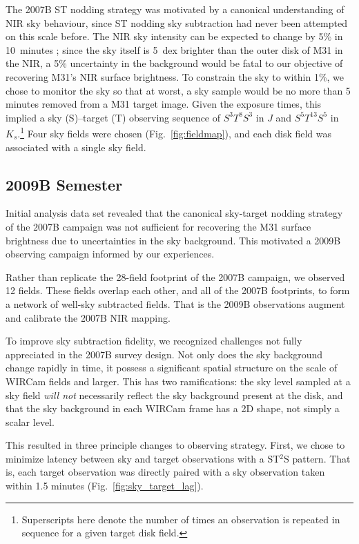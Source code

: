 \documentclass[iop]{emulateapj}
\newcommand{\Fig}[1]{Fig.~\ref{fig:#1}}  %
\begin{document}
The 2007B ST nodding strategy was motivated by a canonical understanding of NIR sky behaviour, since ST nodding sky subtraction had never been attempted on this scale before. The NIR sky intensity can be expected to change by 5\% in 10~minutes \citep{Adams:1996,Vaduvescu:2004}; since the sky itself is 5~dex brighter than the outer disk of M31 in the NIR, a 5\% uncertainty in the background would be fatal to our objective of recovering M31's NIR surface brightness. To constrain the sky to within 1\%, we chose to monitor the sky so that at worst, a sky sample would be no more than 5 minutes removed from a M31 target image. Given the exposure times, this implied a sky (S)--target (T) observing sequence of $S^3T^8S^3$ in $J$ and $S^5T^{13}S^5$ in $K_s$.\footnote{Superscripts here denote the number of times an observation is repeated in sequence for a given target disk field.} Four sky fields were chosen (\Fig{fieldmap}), and each disk field was associated with a single sky field.


\subsection{2009B Semester} %
\label{sub:obs9}

Initial analysis data set revealed that the canonical sky-target nodding strategy of the 2007B campaign was not sufficient for recovering the M31 surface brightness due to uncertainties in the sky background. This motivated a 2009B observing campaign informed by our experiences.

Rather than replicate the 28-field footprint of the 2007B campaign, we observed 12 fields. These fields overlap each other, and all of the 2007B footprints, to form a network of well-sky subtracted fields. That is the 2009B observations augment and calibrate the 2007B NIR mapping.

To improve sky subtraction fidelity, we recognized challenges not fully appreciated in the 2007B survey design. Not only does the sky background change rapidly in time, it possess a significant spatial structure on the scale of WIRCam fields and larger. This has two ramifications: the sky level sampled at a sky field \emph{will not} necessarily reflect the sky background present at the disk, and that the sky background in each WIRCam frame has a 2D shape, not simply a scalar level.

This resulted in three principle changes to observing strategy. First, we chose to minimize latency between sky and target observations with a ST$^2$S pattern. That is, each target observation was directly paired with a sky observation taken within 1.5 minutes (\Fig{sky_target_lag}).
\end{document}
